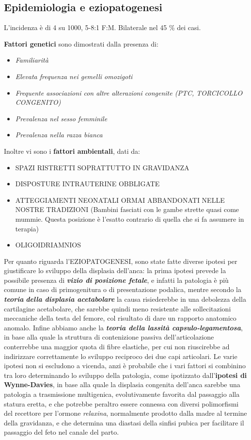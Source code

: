 \subsection{Epidemiologia e eziopatogenesi}

L'incidenza è di 4 su 1000, 5-8:1 F:M. Bilaterale nel 45 \% dei casi.

\textbf{Fattori genetici} sono dimostrati dalla presenza di:
\begin{itemize}
\item \emph{Familiarità}
\item \emph{Elevata frequenza nei gemelli omozigoti}
\item \emph{Frequente associazioni con altre alterazioni congenite (PTC, TORCICOLLO CONGENITO)}
\item \emph{Prevalenza nel sesso femminile}
\item \emph{Prevalenza nella razza bianca}
\end{itemize}

Inoltre vi sono i \textbf{fattori ambientali}, dati da:
\begin{itemize}
\item SPAZI RISTRETTI SOPRATTUTTO IN GRAVIDANZA
\item DISPOSTURE INTRAUTERINE OBBLIGATE
\item ATTEGGIAMENTI NEONATALI ORMAI ABBANDONATI NELLE NOSTRE TRADIZIONI
(Bambini fasciati con le gambe strette quasi come mummie. Questa posizione è l'esatto contrario di quella che si fa assumere in terapia)
\item OLIGOIDRIAMNIOS
\end{itemize}

Per quanto riguarda l'EZIOPATOGENESI, sono state fatte diverse ipotesi per giustificare lo sviluppo della displasia dell'anca: la prima ipotesi prevede la possibile presenza di \textbf{\emph{vizio di posizione fetale}}, e infatti la patologia è più comune in caso di primogenitura o di presentazione podalica, mentre secondo la \textbf{\emph{teoria}} \textbf{\emph{della displasia acetabolare}} la causa risiederebbe in una debolezza della cartilagine acetabolare, che sarebbe quindi meno resistente alle sollecitazioni meccaniche della testa del femore, col risultato di dare un rapporto anatomico anomalo. Infine abbiamo anche la \textbf{\emph{teoria della lassità capsulo-legamentosa}}, in base alla quale la struttura di contenizione passiva dell'articolazione conterrebbe una maggior quota di fibre elastiche, per cui non riuscirebbe ad indirizzare correttamente lo sviluppo reciproco dei due capi articolari. Le varie ipotesi non si escludono a vicenda, anzi è probabile che i vari fattori si combinino tra loro determinando lo sviluppo della patologia, come ipotizzato dall'\textbf{ipotesi di Wynne-Davies}, in base alla quale la displasia congenita dell'anca sarebbe una patologia a trasmissione multigenica, evolutivamente favorita dal passaggio alla statura eretta, e che potrebbe peraltro essere connessa con diversi polimorfismi del recettore per l'ormone \emph{relaxina}, normalmente prodotto dalla madre al termine della gravidanza, e che determina una diastasi della sinfisi pubica per facilitare il passaggio del feto nel canale del parto.

